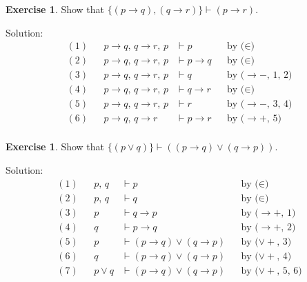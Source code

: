 \documentclass[11pt]{article}
\theoremstyle{definition}
\newtheorem{exercise}[thm]{Exercise}
\begin{document}
\begin{exercise}
Show that $\{(p \rightarrow q), (q \rightarrow r)\} \vdash (p \rightarrow r)$.

Solution:
\begin{align*}
    (1) & & p \rightarrow q,\, q \rightarrow r,\, p &\vdash p & & \text{by ($\in$)} \\
    (2) & & p \rightarrow q,\, q \rightarrow r,\, p &\vdash p \rightarrow q & & \text{by ($\in$)} \\
    (3) & & p \rightarrow q,\, q \rightarrow r,\, p &\vdash q & & \text{by ($\rightarrow-$, 1, 2)} \\
    (4) & & p \rightarrow q,\, q \rightarrow r,\, p &\vdash q \rightarrow r & & \text{by ($\in$)} \\
    (5) & & p \rightarrow q,\, q \rightarrow r,\, p &\vdash r & & \text{by ($\rightarrow-$, 3, 4)} \\
    (6) & & p \rightarrow q,\, q \rightarrow r &\vdash p \rightarrow r & & \text{by ($\rightarrow+$, 5)} \\
\end{align*}
\end{exercise}

\newpage
\begin{exercise}
Show that $\{(p \vee q)\} \vdash ((p \rightarrow q) \vee (q \rightarrow p))$. 

Solution:
\begin{align*}
    (1) & & p,\, q &\vdash p & & \text{by ($\in$)} \\
    (2) & & p,\, q &\vdash q & & \text{by ($\in$)} \\
    (3) & & p &\vdash q \rightarrow p & & \text{by ($\rightarrow+$, 1)} \\
    (4) & & q &\vdash p \rightarrow q & & \text{by ($\rightarrow+$, 2)} \\
    (5) & & p &\vdash (p \rightarrow q) \vee (q \rightarrow p) & & \text{by ($\vee+$, 3)} \\
    (6) & & q &\vdash (p \rightarrow q) \vee (q \rightarrow p) & & \text{by ($\vee+$, 4)} \\
    (7) & & p \vee q &\vdash (p \rightarrow q) \vee (q \rightarrow p) & & \text{by ($\vee+$, 5, 6)} \\
\end{align*}
\end{exercise}
\end{document}
